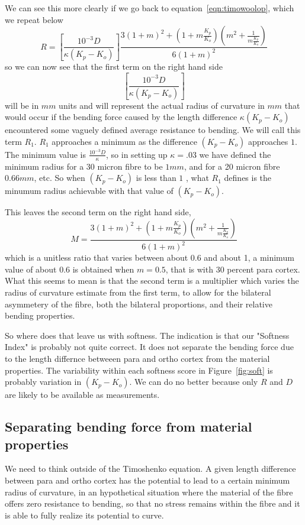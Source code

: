 \documentclass[titlepage]{article}  %
\begin{document}
 We can see this more clearly if we go back to equation~\ref{eqn:timowoolop}, which we repeat below
\begin{displaymath}
\label{eqn:timorepeat}
R = \left[ \frac{10^{-3}D}{\kappa (K_{p} - K_{o})} \right] \frac{ 3(1+m)^{2}+(1+m \frac{K_{p}}{K_{o}})(m^{2}+\frac{1}{m \frac{K_{p}}{K_{o}}})} {6(1+m)^{2}}
\end{displaymath}
so we can now see that the first term on the right hand side 
\begin{displaymath}
\left[ \frac{10^{-3}D}{\kappa (K_{p} - K_{o})} \right]
\end{displaymath}
will be in $mm$ units and will represent the actual radius of curvature in $mm$ that would occur if the bending force caused by the length difference $\kappa(K_{p} - K_{o})$ encountered some vaguely defined average resistance to bending. We will call this term $R_{1}$. $R_{1}$ approaches a minimum as the difference $(K_{p} - K_{o})$ approaches $1$. The minimum value is $\frac{10^{-3}D}{\kappa}$, so in setting up $\kappa = .03$ we have defined the minimum radius for a 30 micron fibre to be $ 1mm$, and for a 20 micron fibre $0.66mm$, etc. So when $(K_{p} - K_{o})$ is less than $1$ , what $R_{1}$ defines is the minumum radius achievable with that value of $(K_{p} - K_{o})$. 

This leaves the second term on the right hand side,
\begin{displaymath}
M = \frac{ 3(1+m)^{2}+(1+m \frac{K_{p}}{K_{o}})(m^{2}+\frac{1}{m \frac{K_{p}}{K_{o}}})} {6(1+m)^{2}}
\end{displaymath}
which is a unitless ratio that varies between about 0.6 and about 1, a minimum value of about 0.6 is obtained when $m=0.5$, that is with 30 percent para cortex.
What this seems to mean is that the second term is a multiplier which varies the radius of curvature estimate from the first term, to allow for the bilateral asymmetery of the fibre, both the bilateral proportions, and their relative bending properties.

So where does that leave us with softness. The indication is that our "Softness Index" is probably not quite correct.  It does not separate the bending force due to the length differnce betweeen para and ortho cortex from the material properties. The variability within each softness score in Figure~\ref{fig:soft} is probably variation in $(K_{p} - K_{o})$. We can do no better because only $R$ and $D$ are likely to be available as measurements.

\subsection{Separating bending force from material properties}
We need to think outside of the Timoshenko equation. A given length difference between para and ortho cortex has the potential to lead to a certain minimum radius of curvature, in an hypothetical situation where the material of the fibre offers zero resistance to bending, so that no stress remains within the fibre and it is able to fully realize its potential to curve. 
\end{document}
